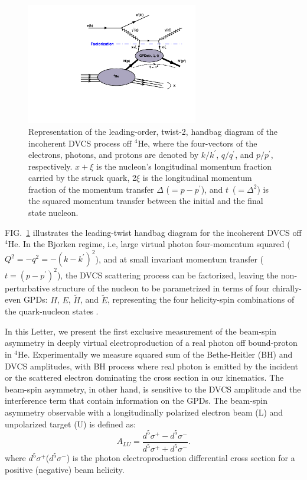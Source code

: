 \documentclass[twocolumn,nofootinbib,showpacs,prl,superscriptaddress,secnumarabic,amssymb,nobibnotes,aps,floatfix]{revtex4}
\begin{document}
\begin{figure}[tb]
\includegraphics[width=7.5cm]{figs/handbag_incoherent.pdf}
\caption{Representation of the leading-order, twist-2, handbag diagram of the 
   incoherent DVCS process off $^4$He, where the four-vectors of the electrons, 
   photons, and protons are denoted by $k/k^\prime$, $q/q^\prime$, and 
   $p/p^\prime$, respectively. $x+\xi$ is the nucleon’s longitudinal momentum 
   fraction carried by the struck quark, 2$\xi$ is the longitudinal momentum 
   fraction of the momentum transfer $\Delta$ ($= p - p^\prime$), and 
   $t$~($=\Delta^2$) is the squared momentum transfer between the initial and
   the final state nucleon.}
\label{fig:diags}
\end{figure}

FIG.~\ref{fig:diags} illustrates the 
leading-twist handbag diagram for the incoherent DVCS off $^{4}$He. In the 
Bjorken regime, i.e, large virtual photon four-momentum squared 
($Q^{2}=-q^2=-(k-k^\prime)^2$), and at small invariant momentum transfer ($t=(p-p^\prime)^2$), the 
DVCS scattering process can be factorized, leaving the non-perturbative structure 
of the nucleon to be parametrized in terms of four chirally-even GPDs: $H$, 
$E$, $\widetilde{H}$, and $\widetilde{E}$, representing the four helicity-spin 
combinations of the quark-nucleon states \cite{Freund_Collins,Ji_Osborne}.

In this Letter, we present the first exclusive measurement of the beam-spin asymmetry in deeply virtual electroproduction of a real photon off bound-proton in $^{4}$He. Experimentally we measure squared sum of the Bethe-Heitler (BH) and DVCS amplitudes, with BH process where real photon is emitted by the incident or the scattered electron dominating the cross section in our kinematics.   
The beam-spin asymmetry, in other hand, is sensitive to the DVCS amplitude and the interference term that contain information on the GPDs. 
The beam-spin asymmetry observable with a longitudinally polarized electron beam (L) and unpolarized target (U) is defined as:
\begin{equation}
  A_{LU} = \frac{d^{5}\sigma^{+} - d^{5}\sigma^{-} }
                {d^{5}\sigma^{+} + d^{5}\sigma^{-}}.
    \label{BSA_equation}
  \end{equation}
where $d^{5}\sigma^{+}$($d^{5}\sigma^{-}$) is the photon electroproduction 
differential cross section for a positive (negative) beam helicity. 
\end{document}
